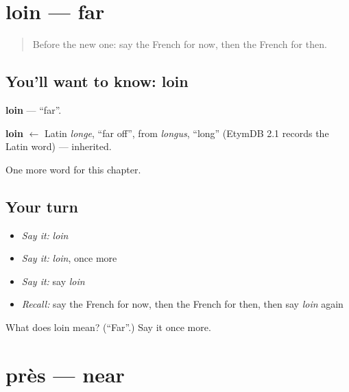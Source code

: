 \section[loin]{loin — far}

\label{lesson:FR-C96-loin}



\begin{quote}
Before the new one: say the French for now, then the French for then.
\end{quote}

\subsection*{You'll want to know: loin}
\textbf{loin} — \textquotedblleft{}far\textquotedblright{}.

\begin{cousinweb}
\textbf{loin} $\leftarrow$ Latin \emph{longe}, \textquotedblleft{}far off\textquotedblright{}, from \emph{longus}, \textquotedblleft{}long\textquotedblright{} (EtymDB 2.1 records the Latin word) — inherited.
\end{cousinweb}

\begin{grammarlens}[title={What you've built}]
One more word for this chapter.
\end{grammarlens}

\subsection*{Your turn}
\begin{itemize}
\raggedright
  \item \emph{Say it:} \emph{loin}
  \item \emph{Say it:} \emph{loin}, once more
  \item \emph{Say it:} say \emph{loin}
  \item \emph{Recall:} say the French for now, then the French for then, then say \emph{loin} again
\end{itemize}

\begin{tcolorbox}[breakable,colback=teal!4,colframe=teal!35!black,title={Before you move on}]
What does loin mean? (\textquotedblleft{}Far\textquotedblright{}.) Say it once more.
\end{tcolorbox}
\section[près]{près — near}

